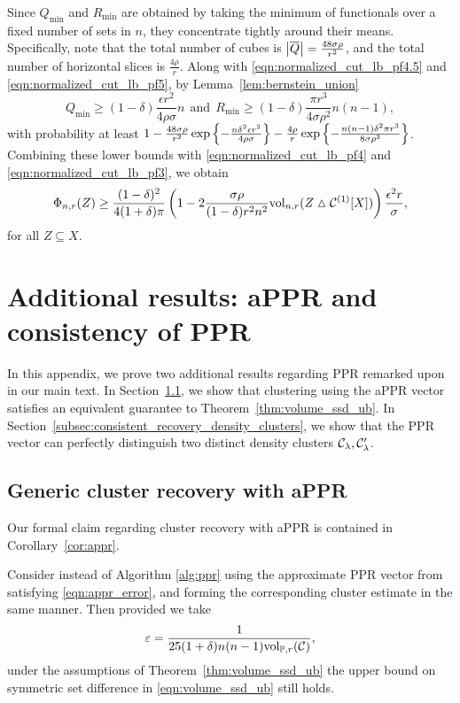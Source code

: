 	Since $Q_{\min}$ and $R_{\min}$ are obtained by taking the minimum of functionals over a fixed number of sets in $n$, they concentrate tightly around their means. Specifically, note that the total number of cubes is $\left \lvert \overline{Q} \right \rvert = \frac{48 \sigma \rho}{r^2}$, and the total number of horizontal slices is $\frac{4\rho}{r}$. Along with \eqref{eqn:normalized_cut_lb_pf4.5} and \eqref{eqn:normalized_cut_lb_pf5}, by Lemma~\ref{lem:bernstein_union} 
	\begin{equation*}
	Q_{\min} \geq (1 - \delta)\frac{\epsilon r^2}{4 \rho \sigma}n ~~\textrm{and}~~ R_{\min} \geq (1 - \delta)\frac{\pi r^3}{4\sigma \rho^2 }n(n - 1),
	\end{equation*}
	with probability at least $1 - \frac{48 \sigma \rho}{r^2}\exp\left\{-\frac{n\delta^2\epsilon r^2}{4 \rho \sigma}\right\} - \frac{4\rho}{r}\exp\left\{-\frac{n(n - 1)\delta^2\pi r^3}{8\sigma\rho^2}\right\}$. Combining these lower bounds with \eqref{eqn:normalized_cut_lb_pf4} and \eqref{eqn:normalized_cut_lb_pf3}, we obtain 
	\begin{equation*}	
	\Phi_{n,r}(Z) \geq \frac{(1 - \delta)^2}{4(1 + \delta)\pi} \left(1 - 2 \frac{\sigma \rho}{(1 - \delta) r^2 n^2} \mathrm{vol}_{n,r}(Z \vartriangle \mathcal{C}^{(1)}[X]) \right) \frac{\epsilon^2 r}{\sigma},
	\end{equation*}
	for all $Z \subseteq X$.

\section{Additional results: aPPR and consistency of PPR}
\label{apdx:appr_misclassification_error}
In this appendix, we prove two additional results regarding PPR remarked upon in our main text. In Section~\ref{subsec:appr_volume_ssd_ub}, we show that clustering using the aPPR vector satisfies an equivalent guarantee to Theorem~\ref{thm:volume_ssd_ub}. In Section~\ref{subsec:consistent_recovery_density_clusters}, we show that the PPR vector can perfectly distinguish two distinct density clusters $\mathcal{C}_{\lambda},\mathcal{C}_{\lambda}'$. 

\subsection{Generic cluster recovery with aPPR}
\label{subsec:appr_volume_ssd_ub}
Our formal claim regarding cluster recovery with aPPR is contained in Corollary~\ref{cor:appr}.
\begin{corollary}
	\label{cor:appr}
	Consider instead of
	Algorithm \ref{alg:ppr} using the approximate PPR vector from
	\citet{andersen2006} satisfying \eqref{eqn:appr_error}, and forming the 
	corresponding cluster estimate  in the same manner.  Then 
	provided we take 
	\begin{equation}
	\label{eqn:appr_parameter}
	\varepsilon = \frac{1}{25(1 + \delta)n(n - 1)\mathrm{vol}_{\mathbb{P},r}(\mathcal{C})} ,
	\end{equation}
	under the assumptions of Theorem~\ref{thm:volume_ssd_ub} the upper bound on symmetric set difference in \eqref{eqn:volume_ssd_ub} still
	holds.
\end{corollary}	
